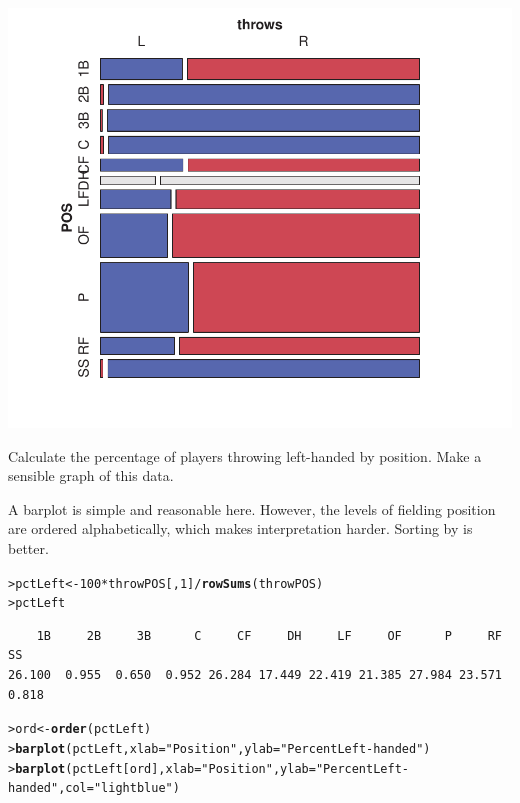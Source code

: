 \documentclass[10pt]{report}\usepackage[]{graphicx}\usepackage[]{color}
\makeatletter
\newcommand{\hlnum}[1]{\textcolor[rgb]{0.686,0.059,0.569}{#1}}%
\newcommand{\hlstr}[1]{\textcolor[rgb]{0.192,0.494,0.8}{#1}}%
\newcommand{\hlopt}[1]{\textcolor[rgb]{0,0,0}{#1}}%
\newcommand{\hlstd}[1]{\textcolor[rgb]{0.345,0.345,0.345}{#1}}%
\newcommand{\hlkwb}[1]{\textcolor[rgb]{0.69,0.353,0.396}{#1}}%
\newcommand{\hlkwc}[1]{\textcolor[rgb]{0.333,0.667,0.333}{#1}}%
\newcommand{\hlkwd}[1]{\textcolor[rgb]{0.737,0.353,0.396}{\textbf{#1}}}%
\newenvironment{kframe}{%
 \def\at@end@of@kframe{}%
 \ifinner\ifhmode%
  \def\at@end@of@kframe{\end{minipage}}%
  \begin{minipage}{\columnwidth}%
 \fi\fi%
 \def\FrameCommand##1{\hskip\@totalleftmargin \hskip-\fboxsep
 \colorbox{shadecolor}{##1}\hskip-\fboxsep
     \hskip-\linewidth \hskip-\@totalleftmargin \hskip\columnwidth}%
 \MakeFramed {\advance\hsize-\width
   \@totalleftmargin\z@ \linewidth\hsize
   \@setminipage}}%
 {\par\unskip\endMakeFramed%
 \at@end@of@kframe}
\newenvironment{knitrout}{}{} %
\renewenvironment{knitrout}{\small\renewcommand{\baselinestretch}{.85}}{} %
\makeatother
\begin{document}
\begin{Exercises}
\begin{enumerate*}
\begin{ans}
\begin{knitrout}
\centerline{\includegraphics[width=.5\textwidth]{soln/fig/ex5_4a-1} }



\end{knitrout}
    \end{ans}
    
    \item Calculate the percentage of players throwing left-handed by position.
    Make a sensible graph of this data.
    \begin{ans}
    A barplot is simple and reasonable here. However, the levels of fielding position are
    ordered alphabetically, which makes interpretation harder. Sorting by 
    is better.
\begin{knitrout}\footnotesize
{}\color{fgcolor}\begin{kframe}
\begin{alltt}
\hlstd{> }\hlstd{pctLeft} \hlkwb{<-} \hlnum{100} \hlopt{*} \hlstd{throwPOS[,}\hlnum{1}\hlstd{]} \hlopt{/} \hlkwd{rowSums}\hlstd{(throwPOS)}
\hlstd{> }\hlstd{pctLeft}
\end{alltt}
\begin{verbatim}
    1B     2B     3B      C     CF     DH     LF     OF      P     RF     SS 
26.100  0.955  0.650  0.952 26.284 17.449 22.419 21.385 27.984 23.571  0.818 
\end{verbatim}
\begin{alltt}
\hlstd{> }\hlstd{ord} \hlkwb{<-} \hlkwd{order}\hlstd{(pctLeft)}
\hlstd{> }\hlkwd{barplot}\hlstd{(pctLeft,} \hlkwc{xlab}\hlstd{=}\hlstr{"Position"}\hlstd{,} \hlkwc{ylab}\hlstd{=}\hlstr{"Percent Left-handed"}\hlstd{)}
\hlstd{> }\hlkwd{barplot}\hlstd{(pctLeft[ord],} \hlkwc{xlab}\hlstd{=}\hlstr{"Position"}\hlstd{,} \hlkwc{ylab}\hlstd{=}\hlstr{"Percent Left-handed"}\hlstd{,} \hlkwc{col}\hlstd{=}\hlstr{"lightblue"}\hlstd{)}
\end{alltt}
\end{kframe}


\end{knitrout}
\end{ans}
\end{enumerate*}
\end{Exercises}
\end{document}
